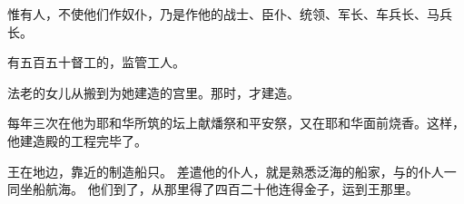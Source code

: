 {惟有{}人，{}不使他们作奴仆，乃是作他的战士、臣仆、统领、军长、车兵长、马兵长。
\par }{\PP {}有五百五十督工的，监管工人。
\par }{\PP {}法老的女儿从{}搬到{}为她建造的宫里。那时，{}才建造{}。
\par }{\PP {}每年三次在他为耶和华所筑的坛上献燔祭和平安祭，又在耶和华面前{}烧香。这样，他建造殿的工程完毕了。
\par }{\PP {}王在{}地{}边，靠近{}的{}制造船只。
差遣他的仆人，就是熟悉泛海的船家，与{}的仆人一同坐船航海。
他们到了{}，从那里得了四百二十他连得金子，运到{}王那里。

}
